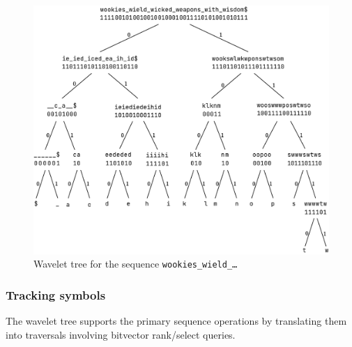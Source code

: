 \begin{figure}[h]
    \includegraphics[width=\textwidth]{assets/WT_full.pdf}
    \caption{\small Wavelet tree for the sequence \texttt{wookies\_wield\_\dots}} \label{fig:wavelet_tree_example}
\end{figure}

\subsubsection*{Tracking symbols}
The wavelet tree supports the primary sequence operations by translating them into traversals involving bitvector rank/select queries.

